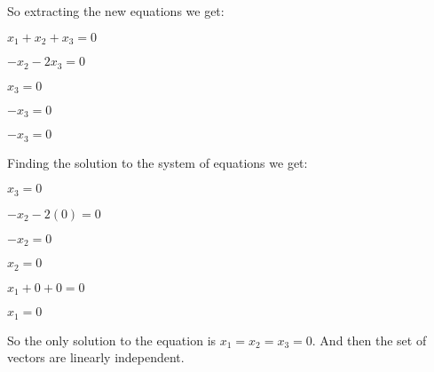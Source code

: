 \singlespacing
\singlespacing
So extracting the new equations we get:

\singlespacing
\singlespacing

\begin{math}
    x_1 + x_2 + x_3 = 0
\end{math}

\singlespacing

\begin{math}
    -x_2 - 2x_3 = 0
\end{math}

\singlespacing

\begin{math}
    x_3 = 0
\end{math}

\singlespacing

\begin{math}
    -x_3 = 0
\end{math}

\singlespacing

\begin{math}
    -x_3 = 0
\end{math}

\singlespacing

Finding the solution to the system of equations we get:

\singlespacing

$x_3 = 0$

\singlespacing

$-x_2 - 2(0) = 0$

$-x_2 = 0$

$x_2 = 0$

\singlespacing

$x_1 + 0 + 0 = 0$

$x_1 = 0$

\singlespacing

So the only solution to the equation is $x_1 = x_2 = x_3 = 0$. And then the set of vectors are linearly independent.